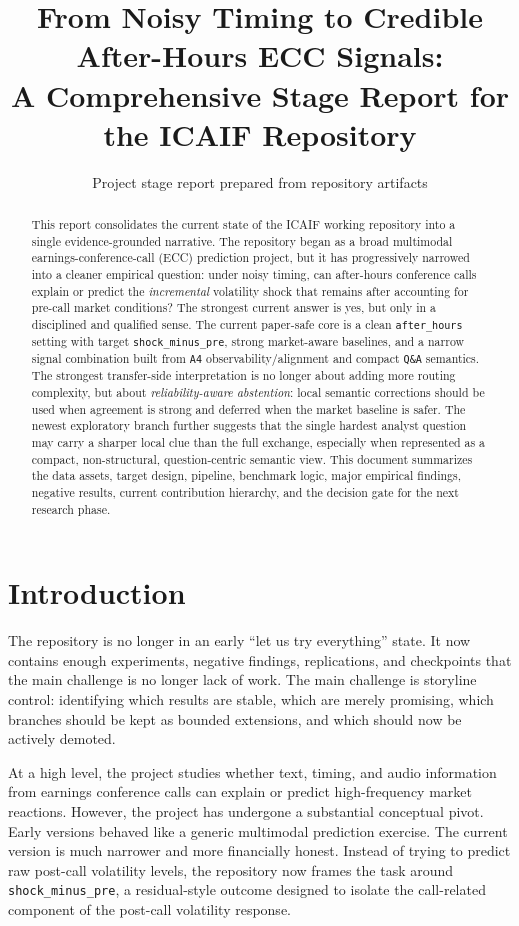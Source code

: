 \documentclass[acmsmall,screen,nonacm]{acmart}
\title{From Noisy Timing to Credible After-Hours ECC Signals:\\A Comprehensive Stage Report for the ICAIF Repository}
\author{Project stage report prepared from repository artifacts}
\affiliation{%
  \institution{FT5005 / ICAIF working repository}
  \country{N/A}}
\begin{document}
\begin{abstract}
This report consolidates the current state of the ICAIF working repository into a single evidence-grounded narrative. The repository began as a broad multimodal earnings-conference-call (ECC) prediction project, but it has progressively narrowed into a cleaner empirical question: under noisy timing, can after-hours conference calls explain or predict the \emph{incremental} volatility shock that remains after accounting for pre-call market conditions? The strongest current answer is yes, but only in a disciplined and qualified sense. The current paper-safe core is a clean \texttt{after\_hours} setting with target \texttt{shock\_minus\_pre}, strong market-aware baselines, and a narrow signal combination built from \texttt{A4} observability/alignment and compact \texttt{Q\&A} semantics. The strongest transfer-side interpretation is no longer about adding more routing complexity, but about \emph{reliability-aware abstention}: local semantic corrections should be used when agreement is strong and deferred when the market baseline is safer. The newest exploratory branch further suggests that the single hardest analyst question may carry a sharper local clue than the full exchange, especially when represented as a compact, non-structural, question-centric semantic view. This document summarizes the data assets, target design, pipeline, benchmark logic, major empirical findings, negative results, current contribution hierarchy, and the decision gate for the next research phase.
\end{abstract}

\maketitle

\section{Introduction}
The repository is no longer in an early ``let us try everything'' state. It now contains enough experiments, negative findings, replications, and checkpoints that the main challenge is no longer lack of work. The main challenge is storyline control: identifying which results are stable, which are merely promising, which branches should be kept as bounded extensions, and which should now be actively demoted.

At a high level, the project studies whether text, timing, and audio information from earnings conference calls can explain or predict high-frequency market reactions. However, the project has undergone a substantial conceptual pivot. Early versions behaved like a generic multimodal prediction exercise. The current version is much narrower and more financially honest. Instead of trying to predict raw post-call volatility levels, the repository now frames the task around \texttt{shock\_minus\_pre}, a residual-style outcome designed to isolate the call-related component of the post-call volatility response.
\end{document}
